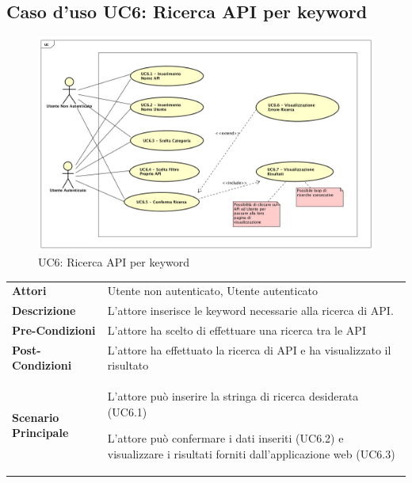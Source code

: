 \newpage
\subsection{Caso d'uso UC6: Ricerca API per keyword }
\label{UC6}
\begin{figure}[ht]
	\centering
	\includegraphics[scale=0.45]{UML/UC6.png}
	\caption{UC6: Ricerca API per keyword }
\end{figure}

\begin{longtable}{ l | p{11cm}}
	\hline
	\rowcolor{Gray}
	 \multicolumn{2}{c}{UC6 - Ricerca API per keyword} \\
	 \hline
	\textbf{Attori} & Utente non autenticato, Utente autenticato \\
	\textbf{Descrizione} & L'attore inserisce le keyword necessarie alla ricerca di API. \\
	\textbf{Pre-Condizioni} & L'attore ha scelto di effettuare una ricerca tra le API \\
	\textbf{Post-Condizioni} & L'attore ha effettuato la ricerca di API e ha visualizzato il risultato\\
	\textbf{Scenario Principale} & 
	\begin{enumerate*}[label=(\arabic*.),itemjoin={\newline}]
		\item L'attore può inserire la stringa di ricerca desiderata (UC6.1)
		\item L'attore può confermare i dati inseriti (UC6.2) e visualizzare i risultati forniti dall'applicazione web (UC6.3)
	\end{enumerate*}\\
\end{longtable}